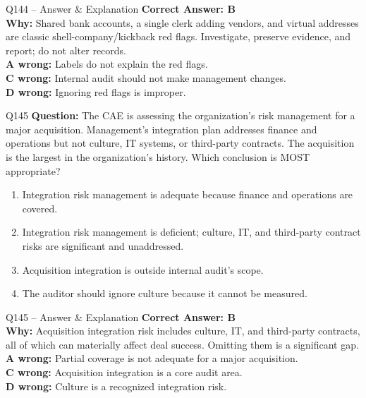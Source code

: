 \documentclass[aspectratio=169,10pt]{beamer}
\begin{document}
	\begin{frame}[t]{Q144 -- Answer \& Explanation}
		\small
		\textbf{Correct Answer: B} \\[4pt]
		\textbf{Why:} Shared bank accounts, a single clerk adding vendors, and virtual addresses are classic shell-company/kickback red flags. Investigate, preserve evidence, and report; do not alter records. \\[4pt]
		\textbf{A wrong:} Labels do not explain the red flags. \\[2pt]
		\textbf{C wrong:} Internal audit should not make management changes. \\[2pt]
		\textbf{D wrong:} Ignoring red flags is improper.
	\end{frame}
	
	\begin{frame}[t]{Q145}
		\small
		\textbf{Question:} The CAE is assessing the organization's risk management for a major acquisition. Management's integration plan addresses finance and operations but not culture, IT systems, or third-party contracts. The acquisition is the largest in the organization's history. Which conclusion is MOST appropriate?
		\begin{enumerate}[label=\Alph*.,itemsep=1pt,topsep=2pt]
			\item Integration risk management is adequate because finance and operations are covered.
			\item Integration risk management is deficient; culture, IT, and third-party contract risks are significant and unaddressed.
			\item Acquisition integration is outside internal audit's scope.
			\item The auditor should ignore culture because it cannot be measured.
		\end{enumerate}
	\end{frame}
	
	\begin{frame}[t]{Q145 -- Answer \& Explanation}
		\small
		\textbf{Correct Answer: B} \\[4pt]
		\textbf{Why:} Acquisition integration risk includes culture, IT, and third-party contracts, all of which can materially affect deal success. Omitting them is a significant gap. \\[4pt]
		\textbf{A wrong:} Partial coverage is not adequate for a major acquisition. \\[2pt]
		\textbf{C wrong:} Acquisition integration is a core audit area. \\[2pt]
		\textbf{D wrong:} Culture is a recognized integration risk.
	\end{frame}
	
\end{document}
